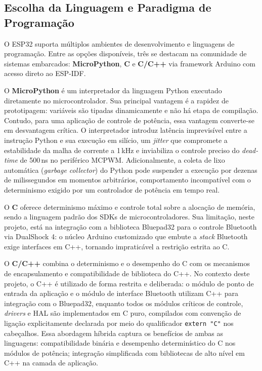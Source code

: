 \subsection{Escolha da Linguagem e Paradigma de Programação}

O ESP32 suporta múltiplos ambientes de desenvolvimento e linguagens de programação. Entre as opções disponíveis, três se destacam na comunidade de sistemas embarcados: \textbf{MicroPython}, \textbf{C} e \textbf{C/C++} via framework Arduino com acesso direto ao ESP-IDF.

O \textbf{MicroPython} é um interpretador da linguagem Python executado diretamente no microcontrolador. Sua principal vantagem é a rapidez de prototipagem: variáveis são tipadas dinamicamente e não há etapa de compilação. Contudo, para uma aplicação de controle de potência, essa vantagem converte-se em desvantagem crítica. O interpretador introduz latência imprevisível entre a instrução Python e sua execução em silício, um \textit{jitter} que compromete a estabilidade da malha de corrente a 1\,kHz e inviabiliza o controle preciso do \textit{dead-time} de 500\,ns no periférico MCPWM. Adicionalmente, a coleta de lixo automática (\textit{garbage collector}) do Python pode suspender a execução por dezenas de milissegundos em momentos arbitrários, comportamento incompatível com o determinismo exigido por um controlador de potência em tempo real.

O \textbf{C} oferece determinismo máximo e controle total sobre a alocação de memória, sendo a linguagem padrão dos SDKs de microcontroladores. Sua limitação, neste projeto, está na integração com a biblioteca Bluepad32 para o controle Bluetooth via DualShock 4: o núcleo Arduino customizado que embute a \textit{stack} Bluetooth exige interfaces em C++, tornando impraticável a restrição estrita ao C.

O \textbf{C/C++} combina o determinismo e o desempenho do C com os mecanismos de encapsulamento e compatibilidade de biblioteca do C++. No contexto deste projeto, o C++ é utilizado de forma restrita e deliberada: o módulo de ponto de entrada da aplicação e o módulo de interface Bluetooth utilizam C++ para integração com o Bluepad32, enquanto todos os módulos críticos de controle, \textit{drivers} e HAL são implementados em C puro, compilados com convenção de ligação explicitamente declarada por meio do qualificador \texttt{extern~"C"} nos cabeçalhos. Essa abordagem híbrida captura os benefícios de ambas as linguagens: compatibilidade binária e desempenho determinístico do C nos módulos de potência; integração simplificada com bibliotecas de alto nível em C++ na camada de aplicação.

